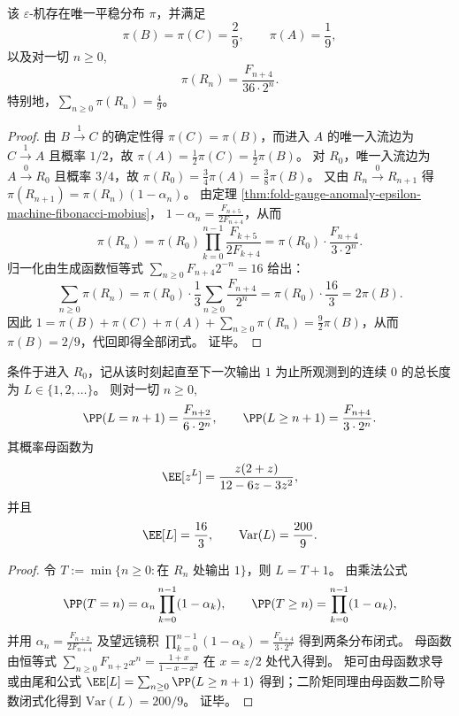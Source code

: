 \begin{theorem}\label{thm:fold-gauge-anomaly-epsilon-machine-stationary-fibonacci-tail}
该 \(\varepsilon\)-机存在唯一平稳分布 \(\pi\)，并满足
\[
\pi(B)=\pi(C)=\frac{2}{9},\qquad \pi(A)=\frac{1}{9},
\]
以及对一切 \(n\ge 0\),
\[
\pi(R_n)=\frac{F_{n+4}}{36\cdot 2^n}.
\]
特别地，\(\sum_{n\ge 0}\pi(R_n)=\frac49\)。
\end{theorem}
\begin{proof}
由 \(B\xrightarrow{1}C\) 的确定性得 \(\pi(C)=\pi(B)\)，而进入 \(A\) 的唯一入流边为 \(C\xrightarrow{1}A\) 且概率 \(1/2\)，故 \(\pi(A)=\frac12\pi(C)=\frac12\pi(B)\)。
对 \(R_0\)，唯一入流边为 \(A\xrightarrow{0}R_0\) 且概率 \(3/4\)，故 \(\pi(R_0)=\frac34\pi(A)=\frac{3}{8}\pi(B)\)。
又由 \(R_n\xrightarrow{0}R_{n+1}\) 得 \(\pi(R_{n+1})=\pi(R_n)(1-\alpha_n)\)。
由定理 \ref{thm:fold-gauge-anomaly-epsilon-machine-fibonacci-mobius}，
\(
1-\alpha_n=\frac{F_{n+5}}{2F_{n+4}}
\)，从而
\[
\pi(R_n)=\pi(R_0)\prod_{k=0}^{n-1}\frac{F_{k+5}}{2F_{k+4}}
=\pi(R_0)\cdot\frac{F_{n+4}}{3\cdot 2^n}.
\]
归一化由生成函数恒等式 \(\sum_{n\ge0}F_{n+4}2^{-n}=16\) 给出：
\[
\sum_{n\ge0}\pi(R_n)=\pi(R_0)\cdot\frac13\sum_{n\ge0}\frac{F_{n+4}}{2^n}
=\pi(R_0)\cdot\frac{16}{3}
=2\pi(B).
\]
因此 \(1=\pi(B)+\pi(C)+\pi(A)+\sum_{n\ge0}\pi(R_n)=\frac92\pi(B)\)，从而 \(\pi(B)=2/9\)，代回即得全部闭式。
证毕。
\end{proof}

\begin{corollary}\label{cor:fold-gauge-anomaly-epsilon-machine-zero-run-length}
条件于进入 \(R_0\)，记从该时刻起直至下一次输出 \(1\) 为止所观测到的连续 \(0\) 的总长度为 \(L\in\{1,2,\dots\}\)。
则对一切 \(n\ge0\),
\[
\PP(L=n+1)=\frac{F_{n+2}}{6\cdot 2^n},\qquad
\PP(L\ge n+1)=\frac{F_{n+4}}{3\cdot 2^n}.
\]
其概率母函数为
\[
\EE[z^L]=\frac{z(2+z)}{12-6z-3z^2},
\]
并且
\[
\EE[L]=\frac{16}{3},\qquad \mathrm{Var}(L)=\frac{200}{9}.
\]
\end{corollary}
\begin{proof}
令 \(T:=\min\{n\ge0:\text{在 }R_n\text{ 处输出 }1\}\)，则 \(L=T+1\)。
由乘法公式
\[
\PP(T=n)=\alpha_n\prod_{k=0}^{n-1}(1-\alpha_k),
\qquad
\PP(T\ge n)=\prod_{k=0}^{n-1}(1-\alpha_k),
\]
并用 \(\alpha_n=\frac{F_{n+2}}{2F_{n+4}}\) 及望远镜积
\(
\prod_{k=0}^{n-1}(1-\alpha_k)=\frac{F_{n+4}}{3\cdot 2^n}
\)
得到两条分布闭式。
母函数由恒等式 \(\sum_{n\ge0}F_{n+2}x^n=\frac{1+x}{1-x-x^2}\) 在 \(x=z/2\) 处代入得到。
矩可由母函数求导或由尾和公式 \(\EE[L]=\sum_{n\ge0}\PP(L\ge n+1)\) 得到；二阶矩同理由母函数二阶导数闭式化得到 \(\mathrm{Var}(L)=200/9\)。
证毕。
\end{proof}

